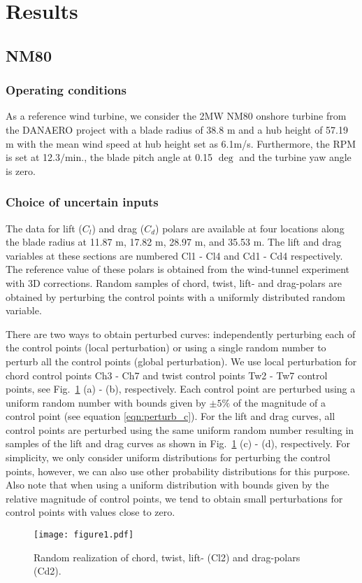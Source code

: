 \section{Results}\label{sec:results}

\subsection{NM80}
\subsubsection{Operating conditions}
As a reference wind turbine, we consider the 2MW NM80 onshore turbine from the DANAERO project \cite{Troldborg2013} with a blade radius of 38.8 m and a hub height of 57.19 m with the mean wind speed at hub height set as 6.1m/s. Furthermore, the RPM is set at 12.3$/\text{min.}$, the blade pitch angle at 0.15 $\deg$ and the turbine yaw angle is zero.

\subsubsection{Choice of uncertain inputs}
The data for lift ($C_l$) and drag ($C_d$) polars are available at four locations along the blade radius at 11.87 m, 17.82 m, 28.97 m, and 35.53 m. The lift and drag variables at these sections are numbered Cl1 - Cl4 and Cd1 - Cd4 respectively. The reference value of these polars is obtained from the wind-tunnel experiment with 3D corrections. Random samples of chord, twist, lift- and drag-polars are obtained by perturbing the control points with a uniformly distributed random variable.  

There are two ways to obtain perturbed curves: independently perturbing each of the control points (local perturbation) or using a single random number to perturb all the control points (global perturbation). We use local perturbation for chord control points Ch3 - Ch7 and twist control points Tw2 - Tw7 control points, see Fig.\ \ref{perturbed_samples} (a) - (b), respectively. Each control point are perturbed using a uniform random number with bounds given by $\pm5\%$ of the magnitude of a control point (see equation \eqref{eqn:perturb_c}). For the lift and drag curves, all control points are perturbed using the same uniform random number resulting in samples of the lift and drag curves as shown in Fig.\ \ref{perturbed_samples} (c) - (d), respectively. For simplicity, we only consider uniform distributions for perturbing the control points, however, we can also use other probability distributions for this purpose. Also note that when using a uniform distribution with bounds given by the relative magnitude of control points, we tend to obtain small perturbations for control points with values close to zero. 
\begin{figure}[h!]
\centering
\texttt{[image: figure1.pdf]}
\caption{Random realization of chord, twist, lift- (Cl2) and drag-polars (Cd2).}
\label{perturbed_samples}
\end{figure}

